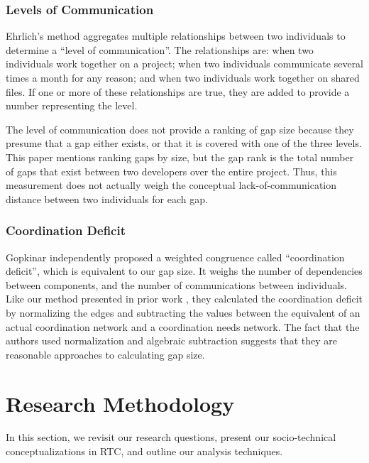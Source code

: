 \subsubsection{Levels of Communication}
Ehrlich's method aggregates multiple relationships between two individuals to determine a ``level of communication''.  The relationships are: when two individuals work together on a project; when two individuals communicate several times a month for any reason; and when two individuals work together on shared files. If one or more of these relationships are true, they are added to provide a number representing the level.

The level of communication does not provide a ranking of gap size because they presume that a gap either exists, or that it is covered with one of the three levels. This paper mentions ranking gaps by size, but the gap rank is the total number of gaps that exist between two developers over the entire project. Thus, this measurement does not actually weigh the conceptual lack-of-communication distance between two individuals for each gap.

\subsubsection{Coordination Deficit}
Gopkinar independently proposed a weighted congruence called ``coordination deficit'', which is equivalent to our gap size. It weighs the number of dependencies between components, and the number of communications between individuals. Like our method presented in prior work \cite{kwan2009:weighted}, they calculated the coordination deficit by normalizing the edges and subtracting the values between the equivalent of an actual coordination network and a coordination needs network. The fact that the authors used normalization and algebraic subtraction suggests that they are reasonable approaches to calculating gap size.



\section{Research Methodology}
\label{sec:methodology}
In this section, we revisit our research questions, present our socio-technical
conceptualizations in RTC, and outline our analysis techniques.


